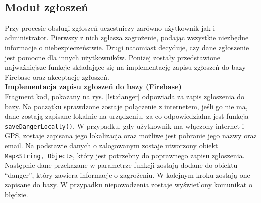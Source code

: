 \noindent
\setlength{\fboxrule}{0.5pt}
\begin{minipage}{\linewidth}
    \label{lst:rystras}
    \centering
\end{minipage}
\\

\subsection{Moduł zgłoszeń}
Przy procesie obsługi zgłoszeń uczestniczy zarówno użytkownik jak i administrator. Pierwszy z nich zgłasza zagrożenie, podając wszystkie niezbędne informacje o niebezpieczeństwie. Drugi natomiast decyduje, czy dane zgłoszenie jest pomocne dla innych użytkowników.  Poniżej zostały przedstawione najważniejsze funkcje składające się na implementację zapisu zgłoszeń do bazy Firebase oraz akceptację zgłoszeń.
\\

\noindent
\textbf{Implementacja zapisu zgłoszeń do bazy (Firebase)} \\ 
\indent Fragment kod, pokazany na rys. \ref{lst:danger} odpowiada za zapis zgłoszenia do bazy. Na początku sprawdzone zostaje połączenie z internetem, jeśli go nie ma, dane zostają zapisane lokalnie na urządzeniu, za co odpowiedzialna jest funkcja \verb|saveDangerLocally()|. W przypadku, gdy użytkownik ma włączony internet i GPS, zostaje zapisana jego lokalizacja oraz możliwe jest pobranie jego nazwy oraz email. Na podstawie danych o zalogowanym zostaje utworzony obiekt  \verb|Map<String, Object>|, który jest potrzebny do poprawnego zapisu zgłoszenia. Następnie dane przekazane w parametrze funkcji zostają dodane do obiektu “danger”, który zawiera informacje o zagrożeniu. W kolejnym kroku zostają one zapisane do bazy. W przypadku niepowodzenia zostaje wyświetlony komunikat o błędzie. \\


